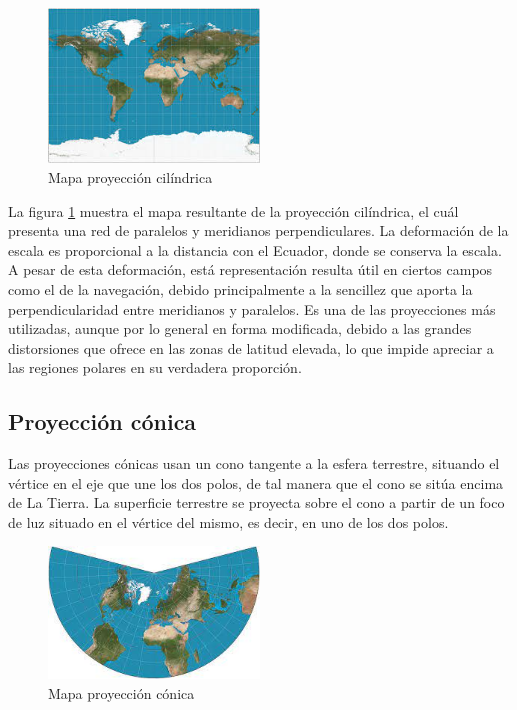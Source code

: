 \begin{figure}[H]
  \centering
  \includegraphics[width=0.50\textwidth]{Imagenes/CRS/proyeccion-cilindrica.png}
  \caption{Mapa proyección cilíndrica} \label{fig:proyeccion-cilindrica}
\end{figure}

La figura \ref{fig:proyeccion-cilindrica} muestra el mapa resultante de la proyección cilíndrica, el cuál presenta una red de paralelos y meridianos perpendiculares.
La deformación de la escala es proporcional a la distancia con el Ecuador, donde se conserva la escala.
A pesar de esta deformación, está representación resulta útil en ciertos campos como el de la navegación, debido principalmente a la sencillez que aporta la perpendicularidad entre meridianos y paralelos.
Es una de las proyecciones más utilizadas, aunque por lo general en forma modificada, debido a las grandes distorsiones que ofrece en las zonas de latitud elevada, lo que impide apreciar a las regiones polares en su verdadera proporción. 

\subsection{Proyección cónica}
Las proyecciones cónicas usan un cono tangente a la esfera terrestre, situando el vértice en el eje que une los dos polos, de tal manera que el cono se sitúa encima de La Tierra. 
La superficie terrestre se proyecta sobre el cono a partir de un foco de luz situado en el vértice del mismo, es decir, en uno de los dos polos.

\begin{figure}[H]
  \centering
  \includegraphics[width=0.50\textwidth]{Imagenes/CRS/proyeccion-conica.png}
  \caption{Mapa proyección cónica} \label{fig:proyeccion-conica}
\end{figure}

